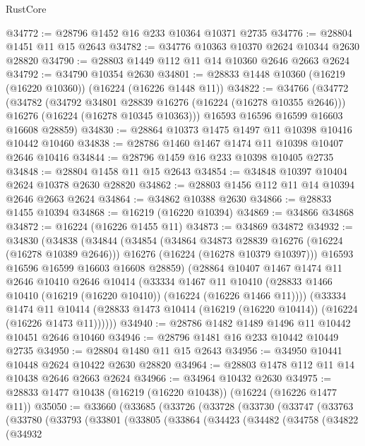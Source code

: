 \begin{lexlean}{RustCore}
\begin{coremodule}
@34772 := @28796 @1452 @16 @233 @10364 @10371 @2735
@34776 := @28804 @1451 @11 @15 @2643
@34782 := @34776 @10363 @10370 @2624 @10344 @2630 @28820
@34790 := @28803 @1449 @112 @11 @14 @10360 @2646 @2663 @2624
@34792 := @34790 @10354 @2630
@34801 := @28833 @1448 @10360 (@16219 (@16220 @10360)) (@16224 (@16226 @1448 @11))
@34822 := @34766
    (@34772
      (@34782
        (@34792 @34801 @28839 @16276 (@16224 (@16278 @10355 @2646)))
        @16276
        (@16224 (@16278 @10345 @10363)))
      @16593
      @16596
      @16599
      @16603
      @16608
      @28859)
@34830 := @28864 @10373 @1475 @1497 @11 @10398 @10416 @10442 @10460
@34838 := @28786 @1460 @1467 @1474 @11 @10398 @10407 @2646 @10416
@34844 := @28796 @1459 @16 @233 @10398 @10405 @2735
@34848 := @28804 @1458 @11 @15 @2643
@34854 := @34848 @10397 @10404 @2624 @10378 @2630 @28820
@34862 := @28803 @1456 @112 @11 @14 @10394 @2646 @2663 @2624
@34864 := @34862 @10388 @2630
@34866 := @28833 @1455 @10394
@34868 := @16219 (@16220 @10394)
@34869 := @34866 @34868
@34872 := @16224 (@16226 @1455 @11)
@34873 := @34869 @34872
@34932 := @34830
    (@34838
      (@34844
        (@34854
          (@34864 @34873 @28839 @16276 (@16224 (@16278 @10389 @2646)))
          @16276
          (@16224 (@16278 @10379 @10397)))
        @16593
        @16596
        @16599
        @16603
        @16608
        @28859)
      (@28864
        @10407
        @1467
        @1474
        @11
        @2646
        @10410
        @2646
        @10414
        (@33334
          @1467
          @11
          @10410
          (@28833 @1466 @10410 (@16219 (@16220 @10410)) (@16224 (@16226 @1466 @11))))
        (@33334
          @1474
          @11
          @10414
          (@28833 @1473 @10414 (@16219 (@16220 @10414)) (@16224 (@16226 @1473 @11))))))
@34940 := @28786 @1482 @1489 @1496 @11 @10442 @10451 @2646 @10460
@34946 := @28796 @1481 @16 @233 @10442 @10449 @2735
@34950 := @28804 @1480 @11 @15 @2643
@34956 := @34950 @10441 @10448 @2624 @10422 @2630 @28820
@34964 := @28803 @1478 @112 @11 @14 @10438 @2646 @2663 @2624
@34966 := @34964 @10432 @2630
@34975 := @28833 @1477 @10438 (@16219 (@16220 @10438)) (@16224 (@16226 @1477 @11))
@35050 := @33660
    (@33685
      (@33726
        (@33728
          (@33730
            (@33747
              (@33763
                (@33780
                  (@33793
                    (@33801
                      (@33805
                        (@33864
                          (@34423
                            (@34482
                              (@34758
                                (@34822
                                  (@34932

\end{coremodule}
\end{lexlean}
